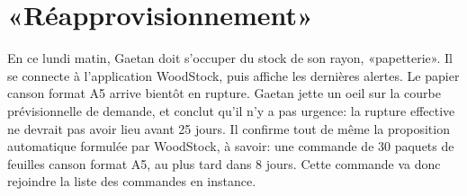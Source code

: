 \section{«Réapprovisionnement»}

En ce lundi matin, Gaetan doit s'occuper du stock de son rayon, «papetterie».
Il se connecte à l'application WoodStock, puis affiche les dernières alertes.
Le papier canson format A5 arrive bientôt en rupture.
Gaetan jette un oeil sur la courbe prévisionnelle de demande, et conclut qu'il n'y a pas urgence: la rupture effective ne devrait pas avoir lieu avant 25 jours.
Il confirme tout de même la proposition automatique formulée par WoodStock, à savoir: une commande de 30 paquets de feuilles canson format A5, au plus tard dans 8 jours.
Cette commande va donc rejoindre la liste des commandes en instance.
